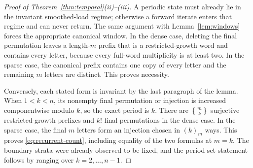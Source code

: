 \documentclass[a4paper,10pt]{amsart}
\theoremstyle{definition}
\theoremstyle{remark}
\newcommand{\Stirling}[2]{\genfrac\{\}{0pt}{}{#1}{#2}}
\begin{document}
\begin{proof}[Proof of Theorem~\ref{thm:temporal}(ii)--(iii)]
A periodic state must already lie in the invariant smoothed-load regime;
otherwise a forward iterate enters that regime and can never return.  The
same argument with Lemma~\ref{lem:windows} forces the appropriate canonical
window.  In the dense case, deleting the final permutation leaves a
length-$m$ prefix that is a restricted-growth word and contains every letter,
because every full-word multiplicity is at least two.  In the sparse case,
the canonical prefix contains one copy of every letter and the remaining
$m$ letters are distinct.  This proves necessity.

Conversely, each stated form is invariant by the last paragraph of the
lemma.  When $1<k<n$, its nonempty final permutation or injection is increased
componentwise modulo $k$, so the exact period is $k$.  There are
$\Stirling{m}{k}$ surjective restricted-growth prefixes and $k!$ final
permutations in the dense case.  In the sparse case, the final $m$ letters
form an injection chosen in $(k)_m$ ways.  This proves
\eqref{eq:recurrent-count}, including equality of the two formulas at
$m=k$.  The boundary strata were already observed to be fixed, and the
period-set statement follows by ranging over $k=2,\ldots,n-1$.
\end{proof}
\end{document}
